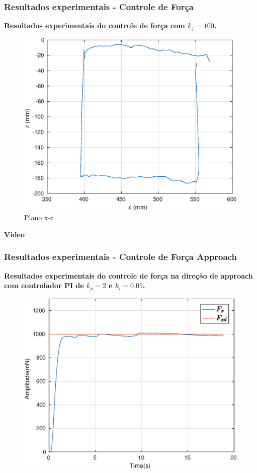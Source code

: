 \documentclass{beamer}
\begin{document}
\begin{frame}
\frametitle{Resultados experimentais - Controle de Força}
\textbf{Resultados experimentais do controle de força com $k_f = 100$.}
\begin{figure}[H]
\includegraphics[width=0.5\linewidth]{./img/float2/xz.eps}
\caption{Plano x-z}
\end{figure}%
\begin{center}
\href{run:./videos/force.mp4}{\textbf{Video}}%
\end{center}
\end{frame}

\begin{frame}
\frametitle{Resultados experimentais - Controle de Força Approach}
\textbf{Resultados experimentais do controle de força na direção de approach com controlador PI de $k_p = 2$ e $k_i = 0.05$. }
\begin{figure}[H]
\includegraphics[width=0.5\linewidth]{./img/force1000_kp2_ki005/Fx.eps}
\end{figure}%
\begin{center}
\end{center}
\end{frame}
\end{document}
